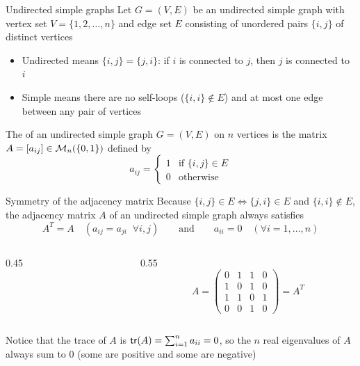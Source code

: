 \documentclass[aspectratio=169]{beamer}\usepackage[]{graphicx}\usepackage[]{xcolor}
\begin{document}
\begin{frame}{Undirected simple graphs}
Let $G = (V, E)$ be an undirected simple graph with vertex set $V = \{1, 2, \ldots, n\}$ and edge set $E$ consisting of unordered pairs $\{i, j\}$ of distinct vertices
\vfill
\begin{itemize}
\item Undirected means $\{i, j\} = \{j, i\}$: if $i$ is connected to $j$, then $j$ is connected to $i$
\vfill
\item Simple means there are no self-loops ($\{i, i\} \notin E$) and at most one edge between any pair of vertices
\end{itemize}
\vfill
\begin{importantdefinition}
The  of an undirected simple graph $G = (V, E)$ on $n$ vertices is the matrix $A = [a_{ij}] \in \mathcal{M}_n(\{0, 1\})$ defined by
\[
a_{ij} = \begin{cases}
1 & \text{if } \{i, j\} \in E \\
0 & \text{otherwise}
\end{cases}
\]
\end{importantdefinition}
\end{frame}


\begin{frame}{Symmetry of the adjacency matrix}
Because $\{i, j\} \in E \iff \{j, i\} \in E$ and $\{i, i\} \notin E$, the adjacency matrix $A$ of an undirected simple graph always satisfies
\[
A^T = A \quad (a_{ij} = a_{ji} \;\;\forall i, j) \qquad \text{and} \qquad a_{ii} = 0 \quad (\forall i = 1, \ldots, n)
\]
\vfill
\begin{columns}[c]
\begin{column}{0.45\textwidth}
\centering
{}
\end{column}
\begin{column}{0.55\textwidth}
\[
A = \begin{pmatrix}
0 & 1 & 1 & 0 \\
1 & 0 & 1 & 0 \\
1 & 1 & 0 & 1 \\
0 & 0 & 1 & 0
\end{pmatrix} = A^T
\]
\end{column}
\end{columns}
\vfill
Notice that the trace of $A$ is $\mathsf{tr}(A) = \sum_{i=1}^n a_{ii} = 0$, so the $n$ real eigenvalues of $A$ always sum to $0$ (some are positive and some are negative)
\end{frame}
\end{document}
